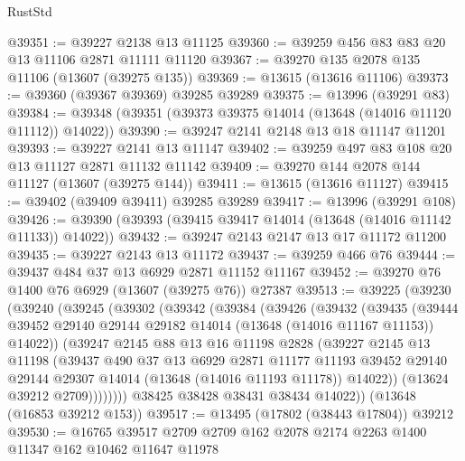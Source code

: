 \begin{lexlean}{RustStd}
\begin{coremodule}
@39351 := @39227 @2138 @13 @11125
@39360 := @39259 @456 @83 @83 @20 @13 @11106 @2871 @11111 @11120
@39367 := @39270 @135 @2078 @135 @11106 (@13607 (@39275 @135))
@39369 := @13615 (@13616 @11106)
@39373 := @39360 (@39367 @39369) @39285 @39289
@39375 := @13996 (@39291 @83)
@39384 := @39348 (@39351 (@39373 @39375 @14014 (@13648 (@14016 @11120 @11112)) @14022))
@39390 := @39247 @2141 @2148 @13 @18 @11147 @11201
@39393 := @39227 @2141 @13 @11147
@39402 := @39259 @497 @83 @108 @20 @13 @11127 @2871 @11132 @11142
@39409 := @39270 @144 @2078 @144 @11127 (@13607 (@39275 @144))
@39411 := @13615 (@13616 @11127)
@39415 := @39402 (@39409 @39411) @39285 @39289
@39417 := @13996 (@39291 @108)
@39426 := @39390 (@39393 (@39415 @39417 @14014 (@13648 (@14016 @11142 @11133)) @14022))
@39432 := @39247 @2143 @2147 @13 @17 @11172 @11200
@39435 := @39227 @2143 @13 @11172
@39437 := @39259 @466 @76
@39444 := @39437 @484 @37 @13 @6929 @2871 @11152 @11167
@39452 := @39270 @76 @1400 @76 @6929 (@13607 (@39275 @76)) @27387
@39513 := @39225
    (@39230
      (@39240
        (@39245
          (@39302
            (@39342
              (@39384
                (@39426
                  (@39432
                    (@39435
                      (@39444
                        @39452
                        @29140
                        @29144
                        @29182
                        @14014
                        (@13648 (@14016 @11167 @11153))
                        @14022))
                    (@39247
                      @2145
                      @88
                      @13
                      @16
                      @11198
                      @2828
                      (@39227
                        @2145
                        @13
                        @11198
                        (@39437
                          @490
                          @37
                          @13
                          @6929
                          @2871
                          @11177
                          @11193
                          @39452
                          @29140
                          @29144
                          @29307
                          @14014
                          (@13648 (@14016 @11193 @11178))
                          @14022))
                      (@13624 @39212 @2709))))))))
        @38425
        @38428
        @38431
        @38434
        @14022))
    (@13648 (@16853 @39212 @153))
@39517 := @13495 (@17802 (@38443 @17804)) @39212
@39530 := @16765 @39517 @2709 @2709 @162 @2078 @2174 @2263 @1400 @11347 @162 @10462 @11647 @11978

\end{coremodule}
\end{lexlean}
